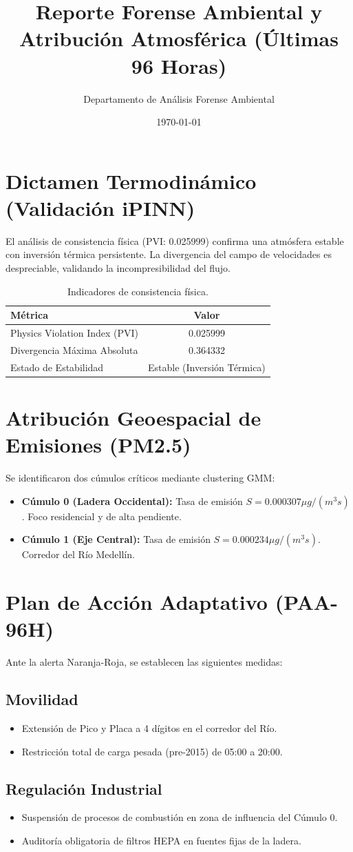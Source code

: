 \documentclass[11pt,a4paper]{article}
\title{Reporte Forense Ambiental y Atribución Atmosférica (Últimas 96 Horas)}
\author{Departamento de Análisis Forense Ambiental}
\date{\today}
\begin{document}
\maketitle

\section{Dictamen Termodinámico (Validación iPINN)}
El análisis de consistencia física (PVI: 0.025999) confirma una atmósfera estable con inversión térmica persistente. La divergencia del campo de velocidades es despreciable, validando la incompresibilidad del flujo.

\begin{table}[h]
\centering
\begin{tabular}{lc}
\toprule
\textbf{Métrica} & \textbf{Valor} \\
\midrule
Physics Violation Index (PVI) & 0.025999 \\
Divergencia Máxima Absoluta & 0.364332 \\
Estado de Estabilidad & Estable (Inversión Térmica) \\
\bottomrule
\end{tabular}
\caption{Indicadores de consistencia física.}
\end{table}

\section{Atribución Geoespacial de Emisiones (PM2.5)}
Se identificaron dos cúmulos críticos mediante clustering GMM:

\begin{itemize}
    \item \textbf{Cúmulo 0 (Ladera Occidental):} Tasa de emisión $S = 0.000307 \mu g/(m^3 s)$. Foco residencial y de alta pendiente.
    \item \textbf{Cúmulo 1 (Eje Central):} Tasa de emisión $S = 0.000234 \mu g/(m^3 s)$. Corredor del Río Medellín.
\end{itemize}

\section{Plan de Acción Adaptativo (PAA-96H)}
Ante la alerta Naranja-Roja, se establecen las siguientes medidas:

\subsection{Movilidad}
\begin{itemize}
    \item Extensión de Pico y Placa a 4 dígitos en el corredor del Río.
    \item Restricción total de carga pesada (pre-2015) de 05:00 a 20:00.
\end{itemize}

\subsection{Regulación Industrial}
\begin{itemize}
    \item Suspensión de procesos de combustión en zona de influencia del Cúmulo 0.
    \item Auditoría obligatoria de filtros HEPA en fuentes fijas de la ladera.
\end{itemize}
\end{document}
